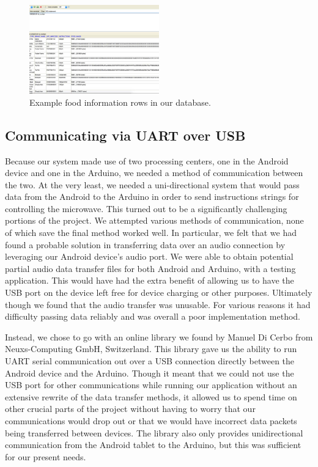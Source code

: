 \documentclass[10pt,journal,letterpaper,twocolumn]{IEEEtran}
\begin{document}
\begin{figure}[h]
\centering
\includegraphics[width=0.5\textwidth]{Database.jpg}
\caption{\label{fig:databaseentries}Example food information rows in our database.}
\end{figure}

\subsection*{Communicating via UART over USB}
Because our system made use of two processing centers, one in the Android device and one in the Arduino, we needed a method of communication between the two.  At the very least, we needed a uni-directional system that would pass data from the Android to the Arduino in order to send instructions strings for controlling the microwave.  This turned out to be a significantly challenging portions of the project.  We attempted various methods of communication, none of which save the final method worked well.  In particular, we felt that we had found a probable solution in transferring data over an audio connection by leveraging our Android device's audio port.  We were able to obtain potential partial audio data transfer files for both Android and Arduino, with a testing application. \cite{audioDataTransfer} This would have had the extra benefit of allowing us to have the USB port on the device left free for device charging or other purposes.  Ultimately though we found that the audio transfer was unusable. For various reasons it had difficulty passing data reliably and was overall a poor implementation method.

Instead, we chose to go with an online library we found by Manuel Di Cerbo from Neuxs-Computing GmbH, Switzerland\cite{uartOverUsbLibrary}. This library gave us the ability to run UART serial communication out over a USB connection directly between the Android device and the Arduino.  Though it meant that we could not use the USB port for other communications while running our application without an extensive rewrite of the data transfer methods, it allowed us to spend time on other crucial parts of the project without having to worry that our communications would drop out or that we would have incorrect data packets being transferred between devices. The library also only provides unidirectional communication from the Android tablet to the Arduino, but this was sufficient for our present needs. 
\end{document}
